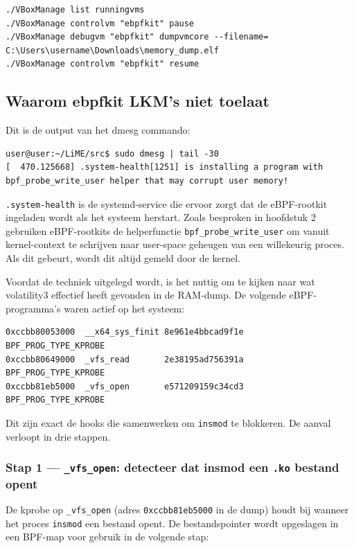 \begin{verbatim}
./VBoxManage list runningvms
./VBoxManage controlvm "ebpfkit" pause
./VBoxManage debugvm "ebpfkit" dumpvmcore --filename= C:\Users\username\Downloads\memory_dump.elf
./VBoxManage controlvm "ebpfkit" resume
\end{verbatim}

\subsection{Waarom ebpfkit LKM's niet toelaat}

Dit is de output van het dmesg commando:
\begin{verbatim}
user@user:~/LiME/src$ sudo dmesg | tail -30
[  470.125668] .system-health[1251] is installing a program with 
bpf_probe_write_user helper that may corrupt user memory!
\end{verbatim}

\texttt{.system-health} is de systemd-service die ervoor zorgt dat de eBPF-rootkit 
ingeladen wordt als het systeem herstart. Zoals besproken in hoofdstuk 2 
gebruiken eBPF-rootkits de helperfunctie \texttt{bpf\_probe\_write\_user} om vanuit 
kernel-context te schrijven naar user-space geheugen van een willekeurig proces. 
Als dit gebeurt, wordt dit altijd gemeld door de kernel.

Voordat de techniek uitgelegd wordt, is het nuttig om te kijken naar wat 
volatility3 effectief heeft gevonden in de RAM-dump. De volgende eBPF-programma's 
waren actief op het systeem:

\begin{verbatim}
0xccbb80053000  __x64_sys_finit 8e961e4bbcad9f1e   BPF_PROG_TYPE_KPROBE
0xccbb80649000  _vfs_read       2e38195ad756391a   BPF_PROG_TYPE_KPROBE
0xccbb81eb5000  _vfs_open       e571209159c34cd3   BPF_PROG_TYPE_KPROBE
\end{verbatim}

Dit zijn exact de hooks die samenwerken om \texttt{insmod} te blokkeren. 
De aanval verloopt in drie stappen.

\subsubsection*{Stap 1 — \texttt{\_vfs\_open}: detecteer dat insmod een \texttt{.ko} bestand opent}

De kprobe op \texttt{\_vfs\_open} (adres \texttt{0xccbb81eb5000} in de dump) 
houdt bij wanneer het proces \texttt{insmod} een bestand opent. De bestandspointer 
wordt opgeslagen in een BPF-map voor gebruik in de volgende stap:

